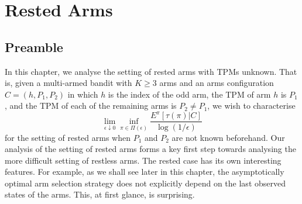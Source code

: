 \chapter{Rested Arms}
\label{ch:rested_arms}
\section{Preamble}

In this chapter, we analyse the setting of rested arms with TPMs unknown. That is, given a multi-armed bandit with $K\geq 3$ arms and an arms configuration $C=(h, P_{1}, P_{2})$ in which $h$ is the index of the odd arm, the TPM of arm $h$ is $P_{1}$, and the TPM of each of the remaining arms is $P_{2}\neq P_{1}$, we wish to characterise $$ \lim\limits_{\epsilon\downarrow 0}  \inf\limits_{\pi\in \Pi(\epsilon)} \frac{E^{\pi}[\tau(\pi)|C]}{\log (1/\epsilon)} $$ for the setting of rested arms when $P_{1}$ and $P_{2}$ are not known beforehand. Our analysis of the setting of rested arms forms a key first step towards analysing the more difficult setting of restless arms. The rested case has its own interesting features. For example, as we shall see later in this chapter, the asymptotically optimal arm selection strategy does not explicitly depend on the last observed states of the arms. This, at first glance, is surprising.

